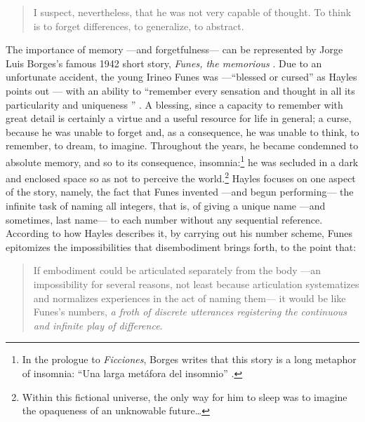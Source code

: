 
% 






\begin{quote}
	I suspect, nevertheless, that he was not very capable of thought. To think is to forget differences, to generalize, to abstract. \parencite[2]{Bor42:Fun}
\end{quote} %

The importance of memory ---and forgetfulness--- can be represented by Jorge Luis Borges's famous 1942 short story, \textit{Funes, the memorious} \parencite{Bor42:Fun}. Due to an unfortunate accident, the young Irineo Funes was ---``blessed or cursed'' as Hayles points out \parencite[156]{Hay93:The}--- with an ability to ``remember every sensation and thought in all its particularity and uniqueness '' \parencite{Hay93:The}. A blessing, since a capacity to remember with great detail is certainly a virtue and a useful resource for life in general; a curse, because he was unable to forget and, as a consequence, he was unable to think, to remember, to dream, to imagine. Throughout the years, he became condemned to absolute memory, and so to its consequence, insomnia:\footnote{In the prologue to \textit{Ficciones}, Borges writes that this story is a long metaphor of insomnia: ``Una larga metáfora del insomnio'' \parencite{Ovi19:Mem}.} he was secluded in a dark and enclosed space so as not to perceive the world.\footnote{Within this fictional universe, the only way for him to sleep was to imagine the opaqueness of an unknowable future\dots} Hayles focuses on one aspect of the story, namely, the fact that Funes invented ---and begun performing--- the infinite task of naming all integers, that is, of giving a unique name ---and sometimes, last name--- to each number without any sequential reference. According to how Hayles describes it, by carrying out his number scheme, Funes epitomizes the impossibilities that disembodiment brings forth, to the point that:

\begin{quote}
	If embodiment could be articulated separately from the body ---an impossibility for several reasons, not least because articulation systematizes and normalizes experiences in the act of naming them--- it would be like Funes's numbers, \textit{a froth of discrete utterances registering the continuous and infinite play of difference}. \im \parencite[156-159]{Hay93:The}
\end{quote} %

